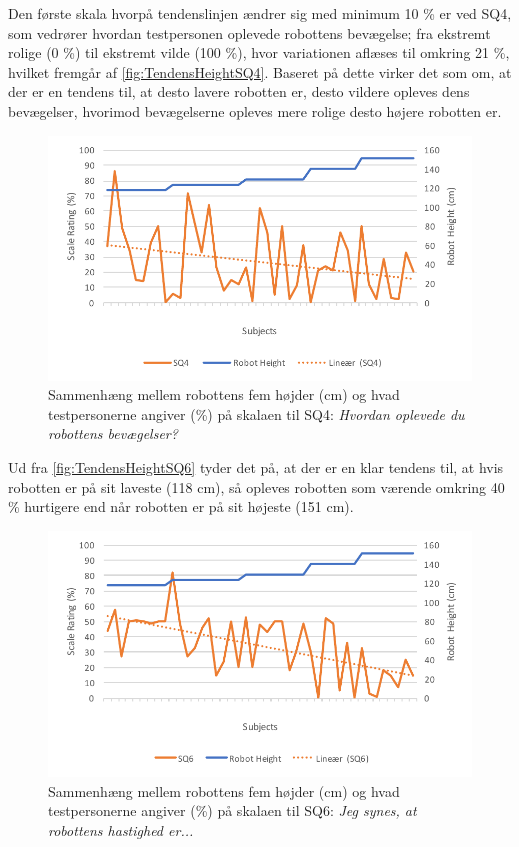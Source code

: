Den første skala hvorpå tendenslinjen ændrer sig med minimum 10 \% er ved SQ4, som vedrører hvordan testpersonen oplevede robottens bevægelse; fra ekstremt rolige (0 \%) til ekstremt vilde (100 \%), hvor variationen aflæses til omkring 21 \%, hvilket fremgår af \autoref{fig:TendensHeightSQ4}. Baseret på dette virker det som om, at der er en tendens til, at desto lavere robotten er, desto vildere opleves dens bevægelser, hvorimod bevægelserne opleves mere rolige desto højere robotten er. 
%
\begin{figure}[H]
\centering
\includegraphics[width=\textwidth]{Figure/DatabehandlingSkalaer/TendensHeight/HeightSQ4}
\caption{Sammenhæng mellem robottens fem højder (cm) og hvad testpersonerne angiver (\%) på skalaen til SQ4: \textit{Hvordan oplevede du robottens bevægelser?}}
\label{fig:TendensHeightSQ4}
\end{figure}
\noindent
%
Ud fra \autoref{fig:TendensHeightSQ6} tyder det på, at der er en klar tendens til, at hvis robotten er på sit laveste (118 cm), så opleves robotten som værende omkring 40 \% hurtigere end når robotten er på sit højeste (151 cm).
%
\begin{figure}[H]
\centering
\includegraphics[width=\textwidth]{Figure/DatabehandlingSkalaer/TendensHeight/HeightSQ6}
\caption{Sammenhæng mellem robottens fem højder (cm) og hvad testpersonerne angiver (\%) på skalaen til SQ6: \textit{Jeg synes, at robottens hastighed er...}}
\label{fig:TendensHeightSQ6}
\end{figure}
